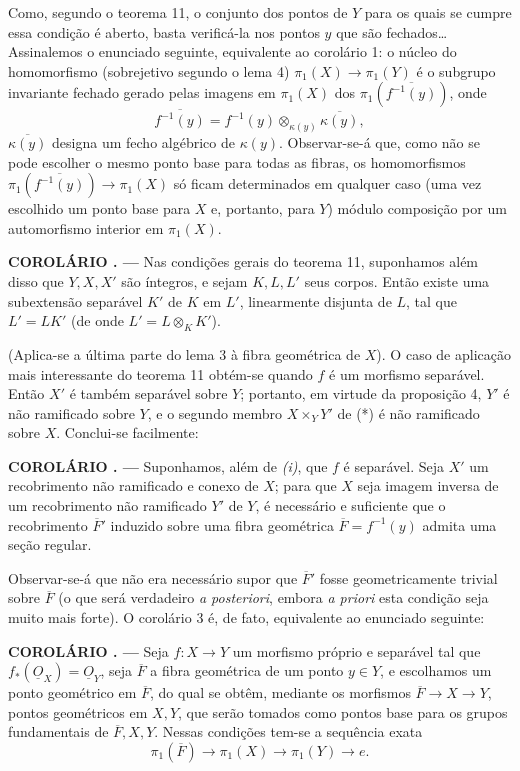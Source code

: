 \documentclass[11pt,twoside,openany]{book}
\numberwithin{equation}{section}
\newcommand{\src}[1]{%
  \phantomsection\hypertarget{src:#1}{}%
  \marginpar{\raggedleft\footnotesize\sffamily #1}%
}
\newcommand{\Osh}{\underline{O}}
\theoremstyle{plain}
\theoremstyle{definition}
\theoremstyle{remark}
\newcommand{\result}[2]{%
  \par\medskip\noindent\textbf{#1%
  \if\relax\detokenize{#2}\relax\else\space#2\fi. ---}\enspace
}
\newcommand{\FgaUnitKey}{frontmatter}
\renewcommand{\src}[1]{%
  \phantomsection\hypertarget{src:\FgaUnitKey:#1}{}%
  \marginpar{\raggedleft\footnotesize\sffamily #1}%
}
\begin{document}
Como, segundo o teorema 11, o conjunto dos pontos de $Y$ para os quais se
cumpre essa condição é aberto, basta verificá-la nos pontos $y$ que são
fechados\ldots{} Assinalemos o enunciado seguinte, equivalente ao corolário 1:
o núcleo do homomorfismo (sobrejetivo segundo o lema 4)
$\pi_1(X)\longrightarrow\pi_1(Y)$ é o subgrupo invariante fechado gerado
pelas imagens em $\pi_1(X)$ dos $\pi_1(\overline{f^{-1}(y)})$, onde
\[
  \overline{f^{-1}(y)}
  =f^{-1}(y)\otimes_{\kappa(y)}\overline{\kappa(y)},
\]
$\overline{\kappa(y)}$ designa um fecho algébrico de $\kappa(y)$. Observar-se-á
que, como não se pode escolher o mesmo ponto base para todas as fibras,
os homomorfismos $\pi_1(\overline{f^{-1}(y)})\longrightarrow\pi_1(X)$ só
ficam determinados em qualquer caso (uma vez escolhido um ponto base para $X$
e, portanto, para $Y$) módulo composição por um automorfismo interior em
$\pi_1(X)$.

\result{COROLÁRIO}{2} Nas condições gerais do teorema 11, suponhamos
além disso que $Y,X,X'$ são íntegros, e sejam $K,L,L'$ seus corpos. Então existe
uma subextensão separável $K'$ de $K$ em $L'$, linearmente disjunta de $L$, tal
que $L'=LK'$ (de onde $L'=L\otimes_K K'$).

(Aplica-se a última parte do lema 3 à fibra geométrica de $X$). O caso de
aplicação mais interessante do teorema 11 obtém-se quando $f$ é um morfismo
separável. Então $X'$ é também separável sobre $Y$; portanto, em virtude
da proposição 4, $Y'$ é não ramificado sobre $Y$, e o segundo membro
$X\times_Y Y'$ de (*) é não ramificado sobre $X$. Conclui-se facilmente:

\result{COROLÁRIO}{3} Suponhamos, além de \textit{(i)}, que $f$ é separável.
Seja $X'$ um recobrimento não ramificado e conexo de $X$; para que
$X$ seja imagem inversa de um
recobrimento não ramificado $Y'$ de $Y$, é necessário e suficiente que o
recobrimento $\overline F'$ induzido sobre uma fibra geométrica
$\overline F=f^{-1}(y)$ admita uma seção regular.

Observar-se-á que não era necessário supor que $\overline F'$ fosse
geometricamente trivial sobre $\overline F$ (o que será verdadeiro \textit{a
posteriori}, embora \textit{a priori} esta condição seja muito mais forte). O
corolário 3 é, de fato, equivalente ao enunciado seguinte:

\src{215}
\result{COROLÁRIO}{4} Seja $f:X\longrightarrow Y$ um morfismo próprio e separável
tal que $f_*(\Osh_X)=\Osh_Y$, seja $\overline F$ a fibra geométrica de um ponto
$y\in Y$, e escolhamos um ponto geométrico em $\overline F$, do qual se obtêm,
mediante os morfismos $\overline F\longrightarrow X\longrightarrow Y$, pontos
geométricos em $X,Y$, que serão tomados como pontos base para os grupos
fundamentais de $\overline F,X,Y$. Nessas condições tem-se a sequência
exata
\[
  \boxed{
    \pi_1(\overline F)\longrightarrow\pi_1(X)
    \longrightarrow\pi_1(Y)\longrightarrow e
  }.
\]
\end{document}
